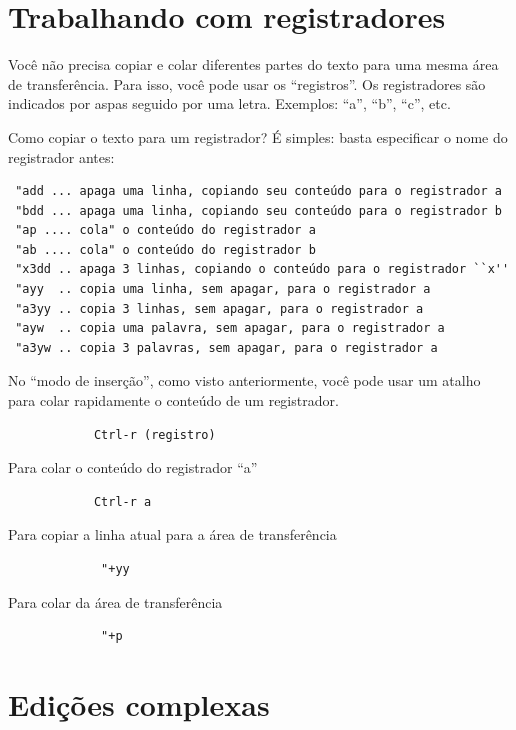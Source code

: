 \documentclass[10pt,a4paper,openany]{book}
\begin{document}
\section{Trabalhando com registradores}
\label{Trabalhando com registradores}

Você não precisa copiar e colar diferentes partes do texto para uma
mesma área de transferência.  Para isso, você pode usar os
``registros''.  Os registradores são indicados por aspas seguido por uma letra.
Exemplos: ``a'', ``b'', ``c'', etc.

Como copiar o texto para um registrador? É simples: basta especificar
o nome do registrador antes:

\begin{verbatim}
 "add ... apaga uma linha, copiando seu conteúdo para o registrador a
 "bdd ... apaga uma linha, copiando seu conteúdo para o registrador b
 "ap .... cola" o conteúdo do registrador a
 "ab .... cola" o conteúdo do registrador b
 "x3dd .. apaga 3 linhas, copiando o conteúdo para o registrador ``x''
 "ayy  .. copia uma linha, sem apagar, para o registrador a
 "a3yy .. copia 3 linhas, sem apagar, para o registrador a
 "ayw  .. copia uma palavra, sem apagar, para o registrador a
 "a3yw .. copia 3 palavras, sem apagar, para o registrador a
\end{verbatim}

No ``modo de inserção'', como visto anteriormente, você pode usar um atalho
para colar rapidamente o conteúdo de um registrador.

\begin{verbatim}
			Ctrl-r (registro)
\end{verbatim}

Para colar o conteúdo do registrador ``a''

\begin{verbatim}
			Ctrl-r a
\end{verbatim}

Para copiar a linha atual para a área de transferência

\begin{verbatim}
			 "+yy
\end{verbatim}

Para colar da área de transferência

\begin{verbatim}
			 "+p
\end{verbatim}

\section{Edições complexas }
\label{Edições complexas }
\end{document}
